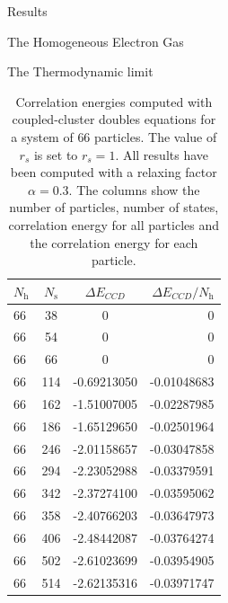 \documentclass[twoside,english]{uiofysmaster}
\begin{document}
\begin{chapter}{Results}
\begin{section}{The Homogeneous Electron Gas}
\begin{subsection}{The Thermodynamic limit}
			\begin{table}[H]
				\begin{center}
					\begin{tabular}[center]{l  c  c r}
						$N_{\text{h}}$ & $N_{\text{s}}$ & $\Delta E_{CCD}$ & $\Delta E_{CCD}/N_{\text{h}}$ \\
						\hline
						66 &  38 & 0 &0\\
						66 &  54 & 0 &0\\
						66 &  66 & 0 &0\\
						66 & 114 & -0.69213050 & -0.01048683 \\
						66 & 162 & -1.51007005 & -0.02287985 \\
						66 & 186 & -1.65129650 & -0.02501964 \\
						66 & 246 & -2.01158657 & -0.03047858 \\
						66 & 294 & -2.23052988 & -0.03379591 \\
						66 & 342 & -2.37274100 & -0.03595062 \\
						66 & 358 & -2.40766203 & -0.03647973 \\
						66 & 406 & -2.48442087 & -0.03764274 \\
						66 & 502 & -2.61023699 & -0.03954905 \\
						66 & 514 & -2.62135316 & -0.03971747 \\
					\end{tabular}
				\end{center}
				\caption{Correlation energies computed with coupled-cluster doubles equations for a system of $66$ particles. The value of $r_s$ is set to $r_s=1$. All results have been computed with a relaxing factor $\alpha=0.3$. The columns show the number of particles, number of states, correlation energy for all particles and the correlation energy for each particle.}
				\label{table:ThermodynamicLimit4}
			\end{table}


\end{subsection}
\end{section}
\end{chapter}
\end{document}
